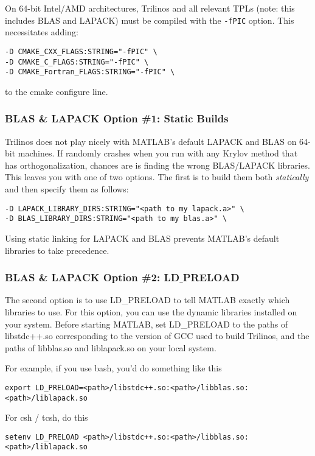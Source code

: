 On 64-bit Intel/AMD architectures, Trilinos and all relevant TPLs
(note: this includes BLAS and LAPACK)
must be compiled with the \texttt{-fPIC} option.  This necessitates adding:
\begin{verbatim}
-D CMAKE_CXX_FLAGS:STRING="-fPIC" \
-D CMAKE_C_FLAGS:STRING="-fPIC" \
-D CMAKE_Fortran_FLAGS:STRING="-fPIC" \
\end{verbatim}
to the cmake configure line.  

\subsubsection{BLAS \& LAPACK Option \#1: Static Builds}
Trilinos does not play nicely with MATLAB's default LAPACK and BLAS on
64-bit machines.  
If \muemex randomly crashes when you run with any Krylov method that
has orthogonalization, chances are \muemex is finding the wrong
BLAS/LAPACK libraries. 
This leaves you
with one of two options.  The first is to build them both \textit{statically}
and then specify them as follows:
\begin{verbatim}
-D LAPACK_LIBRARY_DIRS:STRING="<path to my lapack.a>" \
-D BLAS_LIBRARY_DIRS:STRING="<path to my blas.a>" \
\end{verbatim}
Using static linking for LAPACK and BLAS prevents MATLAB's default libraries to take precedence.

\subsubsection{BLAS \& LAPACK Option \#2: LD$\_$PRELOAD}
The second option is to use \textsf{LD\_PRELOAD} to tell MATLAB exactly
which libraries to use.  For this option, you can use the dynamic
libraries installed on your system.
Before starting MATLAB, set
LD\_PRELOAD to the paths of libstdc++.so corresponding to the version of GCC used
to build Trilinos, and the paths of libblas.so and liblapack.so on your local system.

For example, if you use bash, you'd do something like this
\begin{verbatim}
export LD_PRELOAD=<path>/libstdc++.so:<path>/libblas.so:<path>/liblapack.so
\end{verbatim}

For csh / tcsh, do this
\begin{verbatim}
setenv LD_PRELOAD <path>/libstdc++.so:<path>/libblas.so:<path>/liblapack.so
\end{verbatim}

